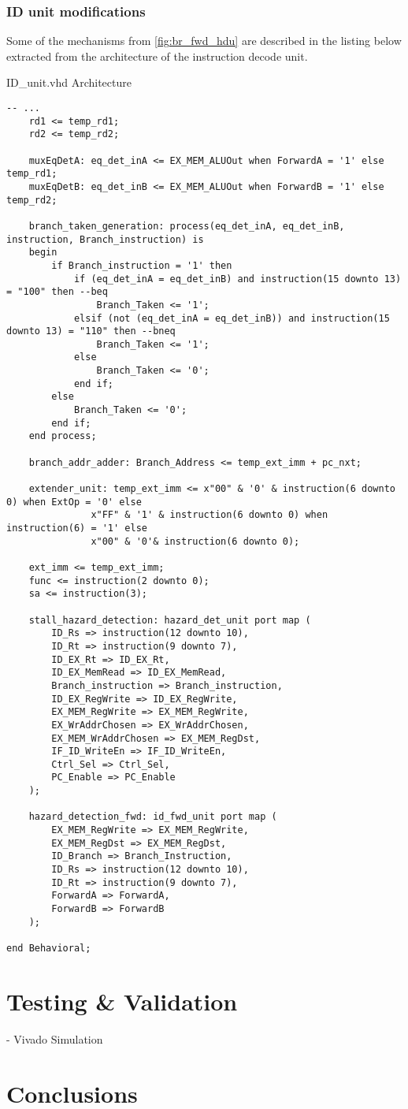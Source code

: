 \documentclass[a4paper,12pt]{report}
\begin{document}
\subsection{ID unit modifications}
Some of the mechanisms from \ref{fig:br_fwd_hdu} are described in the listing below extracted from the architecture of the instruction decode unit.

\begin{my-listing}{ ID\_unit.vhd Architecture}
    \begin{lstlisting}[style=vhdl]
-- ...    
    rd1 <= temp_rd1;
    rd2 <= temp_rd2;
    
    muxEqDetA: eq_det_inA <= EX_MEM_ALUOut when ForwardA = '1' else temp_rd1;
    muxEqDetB: eq_det_inB <= EX_MEM_ALUOut when ForwardB = '1' else temp_rd2;
    
    branch_taken_generation: process(eq_det_inA, eq_det_inB, instruction, Branch_instruction) is 
    begin        
        if Branch_instruction = '1' then
            if (eq_det_inA = eq_det_inB) and instruction(15 downto 13) = "100" then --beq
                Branch_Taken <= '1';
            elsif (not (eq_det_inA = eq_det_inB)) and instruction(15 downto 13) = "110" then --bneq
                Branch_Taken <= '1';
            else
                Branch_Taken <= '0';
            end if;
        else 
            Branch_Taken <= '0';
        end if;
    end process;
    
    branch_addr_adder: Branch_Address <= temp_ext_imm + pc_nxt;
    
    extender_unit: temp_ext_imm <= x"00" & '0' & instruction(6 downto 0) when ExtOp = '0' else
               x"FF" & '1' & instruction(6 downto 0) when instruction(6) = '1' else
               x"00" & '0'& instruction(6 downto 0);
    
    ext_imm <= temp_ext_imm; 
    func <= instruction(2 downto 0);
    sa <= instruction(3);
    
    stall_hazard_detection: hazard_det_unit port map (
        ID_Rs => instruction(12 downto 10), 
        ID_Rt => instruction(9 downto 7),
        ID_EX_Rt => ID_EX_Rt,
        ID_EX_MemRead => ID_EX_MemRead,
        Branch_instruction => Branch_instruction,
        ID_EX_RegWrite => ID_EX_RegWrite,
        EX_MEM_RegWrite => EX_MEM_RegWrite,
        EX_WrAddrChosen => EX_WrAddrChosen,
        EX_MEM_WrAddrChosen => EX_MEM_RegDst,
        IF_ID_WriteEn => IF_ID_WriteEn,
        Ctrl_Sel => Ctrl_Sel,
        PC_Enable => PC_Enable
    );
    
    hazard_detection_fwd: id_fwd_unit port map (
        EX_MEM_RegWrite => EX_MEM_RegWrite,
        EX_MEM_RegDst => EX_MEM_RegDst,
        ID_Branch => Branch_Instruction,
        ID_Rs => instruction(12 downto 10),
        ID_Rt => instruction(9 downto 7),
        ForwardA => ForwardA,
        ForwardB => ForwardB
    );
    
end Behavioral;
    \end{lstlisting}
\end{my-listing}


\chapter{Testing \& Validation}
- Vivado Simulation

\chapter{Conclusions}



\end{document}
